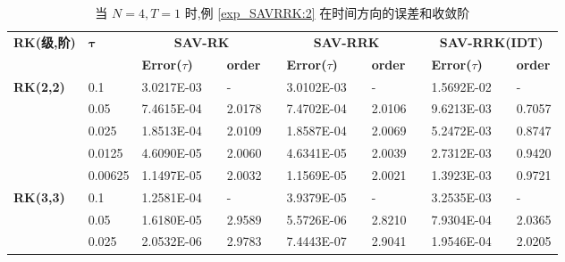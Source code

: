 \documentclass[aspectratio=169]{beamer}
\numberwithin{theorem}{section} %
\numberwithin{equation}{section}%
\numberwithin{figure}{section}%
\numberwithin{table}{section}%
\begin{document}
\begin{frame}%
	\begin{table}[H]\scriptsize
		\centering
		\caption{当 $N=4, T = 1$ 时,例 \ref{exp_SAVRRK:2} 在时间方向的误差和收敛阶}
		\begin{tabular}{lllllrlrlrlrlrl}
		\toprule
		\multicolumn{2}{l}{\multirow{2}[3]{*}{\textbf{RK(级,阶)}}} & \multicolumn{2}{l}{\multirow{2}[3]{*}{$\bm{\tau}$}} & \multicolumn{3}{c}{\textbf{SAV-RK}} &       & \multicolumn{3}{c}{\textbf{SAV-RRK}} &       & \multicolumn{3}{c}{\textbf{SAV-RRK(IDT)}} \\
		\cmidrule{5-7}\cmidrule{9-11}\cmidrule{13-15}    \multicolumn{2}{l}{} & \multicolumn{2}{l}{} & \textbf{Error($\tau$)} &       & \textbf{order} &       & \textbf{Error($\tau$)} &       & \textbf{order} &       & \textbf{Error($\tau$)} &       & \textbf{order} \\
		\hline
		\multicolumn{2}{l}{\multirow{5}[0]{*}{\textbf{RK(2,2)}}} & \multicolumn{2}{l}{0.1} & 3.0217E-03 &       & -     &       & 3.0102E-03 &       & -     &       & 1.5692E-02 &       & - \\
		\multicolumn{2}{l}{} & \multicolumn{2}{l}{0.05} & 7.4615E-04 &       & 2.0178  &       & 7.4702E-04 &       & 2.0106  &       & 9.6213E-03 &       & 0.7057  \\
		\multicolumn{2}{l}{} & \multicolumn{2}{l}{0.025} & 1.8513E-04 &       & 2.0109  &       & 1.8587E-04 &       & 2.0069  &       & 5.2472E-03 &       & 0.8747  \\
		\multicolumn{2}{l}{} & \multicolumn{2}{l}{0.0125} & 4.6090E-05 &       & 2.0060  &       & 4.6341E-05 &       & 2.0039  &       & 2.7312E-03 &       & 0.9420  \\
		\multicolumn{2}{l}{} & \multicolumn{2}{l}{0.00625} & 1.1497E-05 &       & 2.0032  &       & 1.1569E-05 &       & 2.0021  &       & 1.3923E-03 &       & 0.9721  \\
		\multicolumn{2}{l}{\multirow{5}[0]{*}{\textbf{RK(3,3)}}} & \multicolumn{2}{l}{0.1} & 1.2581E-04 &       & -     &       & 3.9379E-05 &       & -     &       & 3.2535E-03 &       & - \\
		\multicolumn{2}{l}{} & \multicolumn{2}{l}{0.05} & 1.6180E-05 &       & 2.9589  &       & 5.5726E-06 &       & 2.8210  &       & 7.9304E-04 &       & 2.0365  \\
		\multicolumn{2}{l}{} & \multicolumn{2}{l}{0.025} & 2.0532E-06 &       & 2.9783  &       & 7.4443E-07 &       & 2.9041  &       & 1.9546E-04 &       & 2.0205  \\

\end{tabular}
\end{table}
\end{frame}
\end{document}
